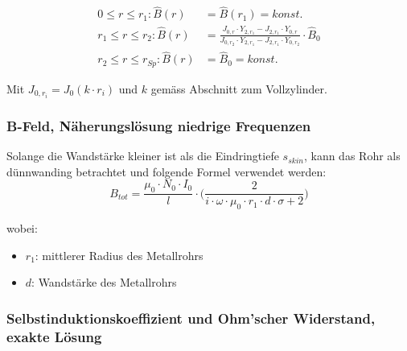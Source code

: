\begin{align}
    \label{eq:hohlzylinder:BExact}
    0 \leq r \leq r_1:      \hat{B} (r) & = \hat{B} (r_1) = konst. \\
    r_1 \leq r \leq r_2:    \hat{B} (r) & = \frac{J_{0,r} \cdot Y_{2,r_1} - J_{2,r_1} \cdot Y_{0,r}}{J_{0,r_2} \cdot Y_{2,r_1} - J_{2,r_1} \cdot Y_{0,r_2}} \cdot \hat{B}_0 \\
    r_2 \leq r \leq r_{Sp}: \hat{B} (r) & = \hat{B}_0 = konst.
\end{align}

Mit $J_{0,r_i} = J_0 (k \cdot r_i)$ und $k$ gem\"ass Abschnitt zum Vollzylinder.

\subsubsection{B-Feld, N\"aherungsl\"osung niedrige Frequenzen}
\label{sec:arbgru:subsec:hohlzylinder:BApprox}

Solange die  Wandst\"arke kleiner ist  als die Eindringtiefe  $s_{skin}$, kann
das Rohr als d\"unnwanding betrachtet und folgende Formel verwendet werden:
\begin{equation}
    \label{eq:hohlzylinder:BApprox}
    B_{tot} = \frac{\mu_0 \cdot N_0 \cdot I_0}{l} \cdot \Biggl( \frac{2}{i \cdot \omega \cdot \mu_0 \cdot r_1 \cdot d \cdot \sigma + 2} \Biggr)
\end{equation}


wobei:

\begin{itemize}
    \item[]
        $r_1$: mittlerer Radius des Metallrohrs
    \item[]
        $d$: Wandst\"arke des Metallrohrs
\end{itemize}

\subsubsection{Selbstinduktionskoeffizient und Ohm'scher Widerstand, exakte L\"osung}
\label{sec:arbgru:subsec:hohlzylinder:LRexakt}


